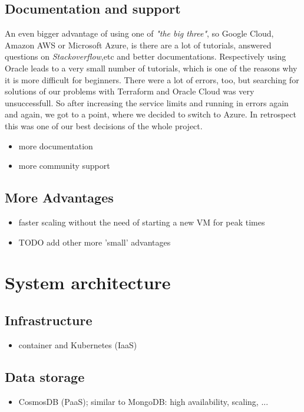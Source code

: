 \documentclass[conference]{IEEEtran}
\begin{document}
\subsection{Documentation and support}
An even bigger advantage of using one of \textit{"the big three"}, so Google Cloud, Amazon AWS or Microsoft Azure, is there are
a lot of tutorials, answered questions on \textit{Stackoverflow},etc and better documentations. Respectively using Oracle leads to
a very small number of tutorials, which is one of the reasons why it is more difficult for beginners. There were a lot of errors, too,
but searching for solutions of our problems with Terraform and Oracle Cloud was very unsuccessfull.
So after increasing the service limits and running in errors again and again, we got to a point, where we decided to switch to Azure.
In retrospect this was one of our best decisions of the whole project.

\begin{itemize}
	\item more documentation
	\item more community support
\end{itemize}

\subsection{More Advantages}
\begin{itemize}
	\item faster scaling without the need of starting a new VM for peak times
	\item TODO add other more 'small' advantages
\end{itemize}

\section{System architecture}
\label{sec:system-architecture}
\subsection{Infrastructure}
\begin{itemize}
	\item container and Kubernetes (IaaS)
\end{itemize}

\subsection{Data storage}
\begin{itemize}
	\item CosmosDB (PaaS); similar to MongoDB: high availability, scaling, ...
\end{itemize}
\end{document}
